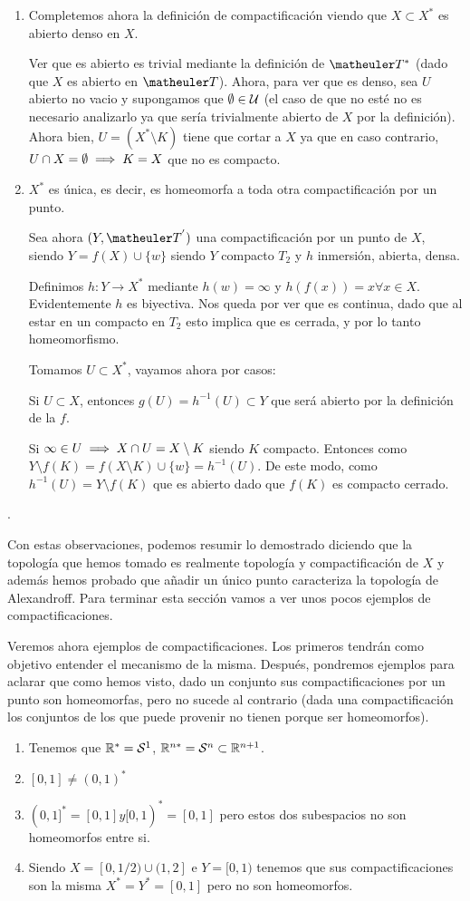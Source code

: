 \begin{obs}
\begin{enumerate}
	\item Completemos ahora la definición de compactificación viendo que $X\subset X^*$ es abierto denso en $X$. 
	
	Ver que es abierto es trivial mediante la definición de $\T^*$ (dado que $X$ es abierto en $\T$). Ahora, para ver que es denso, sea $U$ abierto no vacio y supongamos que $\emptyset\in\mathcal{U}$ (el caso de que no esté no es necesario analizarlo ya que sería trivialmente abierto de $X$ por la definición). Ahora bien, $U=(X^*\setminus K)$ tiene que cortar a $X$ ya que en caso contrario, $U\cap X=\emptyset\implies K=X$ que no es compacto.
	
	
	\item $X^*$ es única, es decir, es homeomorfa a toda otra compactificación por un punto.
	
	Sea ahora $(Y,\T^{'})$  una compactificación por un punto de $X$, siendo $Y= f(X) \cup \{w\}$ siendo $Y$ compacto $T_2$ y $h$ inmersión, abierta, densa.
	
	Definimos $h : Y \longrightarrow X^*$ mediante $h(w) = \infty$ y $h(f(x)) = x\forall x \in X$. Evidentemente $h$ es biyectiva. Nos queda por ver que es continua, dado que al estar en un compacto en $T_2$ esto implica que es cerrada, y por lo tanto homeomorfismo.
	
	Tomamos $U\subset X^*$, vayamos ahora por casos:
	
	Si $U\subset X$, entonces $g(U)=h^{-1}(U)\subset Y$ que será abierto por la definición de la $f$.
	
	Si $\infty\in U\implies X\cap U=X\setminus K$ siendo $K$ compacto. Entonces como $Y\setminus f(K)=f(X\setminus K)\cup \{w\}=h^{-1}(U)$. De este modo, como $h^{-1}(U)=Y\setminus f(K)$ que es abierto dado que $f(K)$ es compacto cerrado.
\end{enumerate}.
\end{obs}
Con estas observaciones, podemos resumir lo demostrado diciendo que la topología que hemos tomado es realmente topología y compactificación de $X$ y además hemos probado que añadir un único punto caracteriza la topología de Alexandroff.
Para terminar esta sección vamos a ver unos pocos ejemplos de compactificaciones.
\begin{exa}
	Veremos ahora ejemplos de compactificaciones. Los primeros tendrán como objetivo entender el mecanismo de la misma. Después, pondremos ejemplos para aclarar que como hemos visto, dado un conjunto sus compactificaciones por un punto son homeomorfas, pero no sucede al contrario (dada una compactificación los conjuntos de los que puede provenir no tienen porque ser homeomorfos). 
	\begin{enumerate}
		\item Tenemos que $\mathbb{R}^*=\mathcal{S}^1$, $\mathbb{R}^{n*}=\mathcal{S}^n\subset \mathbb{R}^{n+1}$.
		\item $[0,1]\ne(0,1)^*$
		\item $(0,1]^*=[0,1] y [0,1)^*=[0,1]$ pero estos dos subespacios no son homeomorfos entre si.
		\item Siendo $X=[0,1/2)\cup(1,2]$ e $Y=[0,1)$ tenemos que sus compactificaciones son la misma $X^*=Y^*=[0,1]$ pero no son homeomorfos.
	\end{enumerate}
\end{exa}
